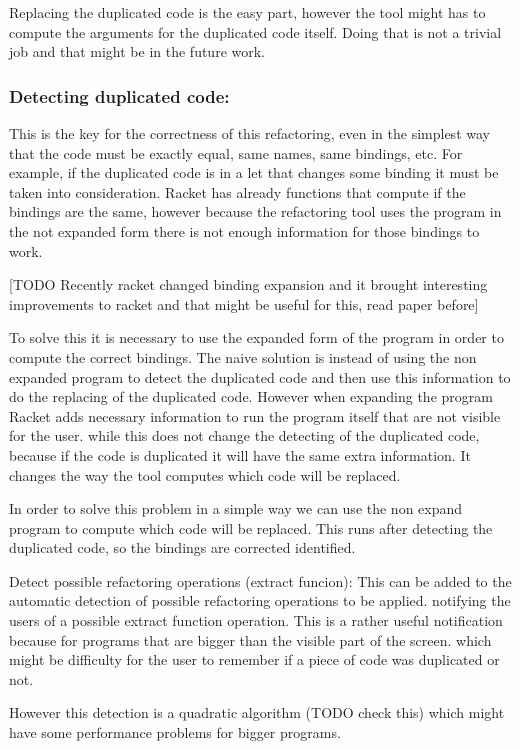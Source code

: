Replacing the duplicated code is the easy part, however the tool might has to compute
the arguments for the duplicated code itself. Doing that is not a trivial job and
that might be in the future work.

\subsubsection{Detecting duplicated code:}
This is the key for the correctness of this refactoring, even in the simplest way
that the code must be exactly equal, same names, same bindings, etc.
For example, if the duplicated code is in a let that changes some binding it must
be taken into consideration. Racket has already functions that compute if the bindings
are the same, however because the refactoring tool uses the program in the not expanded
form there is not enough information for those bindings to work.

[TODO Recently racket changed binding expansion and it brought interesting improvements
to racket and that might be useful for this, read paper before]

To solve this it is necessary to use the expanded form of the program in order
to compute the correct bindings. The naive solution is instead of using the
non expanded program to detect the duplicated code and then use this information
to do the replacing of the duplicated code. However when expanding the program
Racket adds necessary information to run the program itself that are not visible
for the user. while this does not change the detecting of the duplicated code,
because if the code is duplicated it will have the same extra information. It changes
the way the tool computes which code will be replaced.

In order to solve this problem in a simple way we can use the non expand program
to compute which code will be replaced. This runs after detecting the duplicated
code, so the bindings are corrected identified.

Detect possible refactoring operations (extract funcion):
This can be added to the automatic detection of possible refactoring operations
to be applied. notifying the users of a possible extract function operation.
This is a rather useful notification because for programs that are bigger than the
visible part of the screen. which might be difficulty for the user to remember
if a piece of code was duplicated or not.

However this detection is a quadratic algorithm (TODO check this) which might
have some performance problems for bigger programs.

